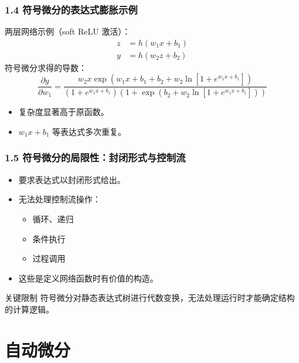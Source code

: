 \documentclass[t,aspectratio=169]{beamer} %
\begin{document}
\begin{frame}
    \frametitle{1.4 符号微分的表达式膨胀示例}
    两层网络示例（soft ReLU 激活）：
    \begin{align}
        z &= h(w_1 x + b_1) \tag{8.44} \\
        y &= h(w_2 z + b_2) \tag{8.45}
    \end{align}
    符号微分求得的导数：
    \begin{equation}
        \frac{\partial y}{\partial w_1} = \frac{w_2 x \exp\left(w_1 x + b_1 + b_2 + w_2 \ln\left[1 + e^{w_1 x + b_1}\right]\right)}{\left(1 + e^{w_1 x + b_1}\right)\left(1 + \exp\left(b_2 + w_2 \ln\left[1 + e^{w_1 x + b_1}\right]\right)\right)}
        \tag{8.48}
    \end{equation}
    \begin{itemize}
        \item 复杂度显著高于原函数。
        \item $w_1 x + b_1$ 等表达式\alert{多次重复}。
    \end{itemize}
\end{frame}

\begin{frame}
    \frametitle{1.5 符号微分的局限性：封闭形式与控制流}
    \begin{itemize}
        \item 要求表达式以\alert{封闭形式}给出。
        \item 无法处理\alert{控制流操作}：
        \begin{itemize}
            \item 循环、递归
            \item 条件执行
            \item 过程调用
        \end{itemize}
        \item 这些是定义网络函数时\alert{有价值}的构造。
    \end{itemize}
    \begin{block}{关键限制}
        符号微分对\alert{静态表达式树}进行代数变换，无法处理运行时才能确定结构的计算逻辑。
    \end{block}
\end{frame}

\section{自动微分}
\end{document}
